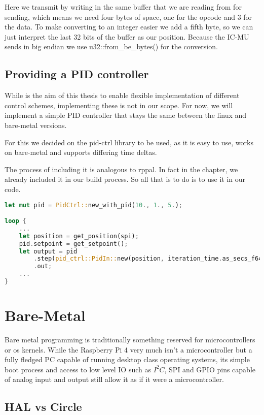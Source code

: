 Here we transmit by writing in the same buffer that we are reading from for sending, which means we need four bytes of space, one for the opcode and 3 for the data.
To make converting to an integer easier we add a fifth byte, so we can just interpret the last 32 bits of the buffer as our position.
Because the IC-MU sends in big endian we use u32::from\_be\_bytes() for the conversion.

\subsection{Providing a PID controller}

While is the aim of this thesis to enable flexible implementation of different control schemes, implementing these is not in our scope.
For now, we will implement a simple PID controller that stays the same between the linux and bare-metal versions.

For this we decided on the pid-ctrl library to be used, as it is easy to use, works on bare-metal and supports differing time deltas.

The process of including it is analogous to rppal. In fact in the  chapter, we already included it in our build process.
So all that is to do is to use it in our code.

\begin{lstlisting}[language=Rust,style=colouredRust]
let mut pid = PidCtrl::new_with_pid(10., 1., 5.);

loop {
    ...
    let position = get_position(spi);
    pid.setpoint = get_setpoint();
    let output = pid
        .step(pid_ctrl::PidIn::new(position, iteration_time.as_secs_f64()))
        .out;
    ...
}
\end{lstlisting}

\section{Bare-Metal}
\label{sec:concept_and_implementation:bare_metal}

Bare metal programming is traditionally something reserved for microcontrollers or os kernels.
While the Raspberry Pi 4 very much isn't a microcontroller but a fully fledged PC capable of running desktop class operating systems,
its simple boot process and access to low level IO such as $I^2C$, SPI and GPIO pins capable of analog input and output still allow it as if it were a microcontroller.

\subsection{HAL vs Circle}
\label{sec:concept_and_implementation:bare-metal:hal}

